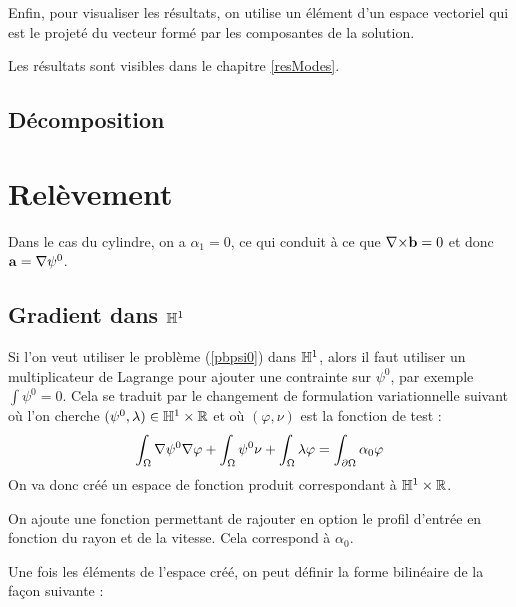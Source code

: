 

Enfin, pour visualiser les résultats, on utilise un élément d'un espace vectoriel qui est le projeté du vecteur formé par les composantes de la solution.



Les résultats sont visibles dans le chapitre \ref{resModes}.

\subsection{Décomposition}

\section{Relèvement}

Dans le cas du cylindre, on a $\alpha_1=0$, ce qui conduit à ce que ${\nabla\times} \mathbf{b}=0$ et donc $\mathbf{a}={\nabla}\psi^0$.

\subsection{Gradient dans ${\mathbb{H}}^1$}
\label{gradh1}

Si l'on veut utiliser le problème (\ref{pbpsi0}) dans ${\mathbb{H}}^1$, alors il faut utiliser un multiplicateur de Lagrange pour ajouter une contrainte sur $\psi^0$, par exemple $\int \psi^0 = 0$. Cela se traduit par le changement de formulation variationnelle suivant où l'on cherche $(\psi^0,\lambda)\in {\mathbb{H}}^1\times{\mathbb{R}}$ et où $(\varphi,\nu)$ est la fonction de test :
\[
\int_\Omega{\nabla} \psi^0{\nabla}\varphi + \int_\Omega \psi^0\nu + \int_\Omega \lambda\varphi = \int_{\partial\Omega} \alpha_0\varphi
\]
On va donc créé un espace de fonction produit correspondant à ${\mathbb{H}}^1\times{\mathbb{R}}$.



On ajoute une fonction permettant de rajouter en option le profil d'entrée en fonction du rayon et de la vitesse. Cela correspond à $\alpha_0$.



Une fois les éléments de l'espace créé, on peut définir la forme bilinéaire de la façon suivante :



